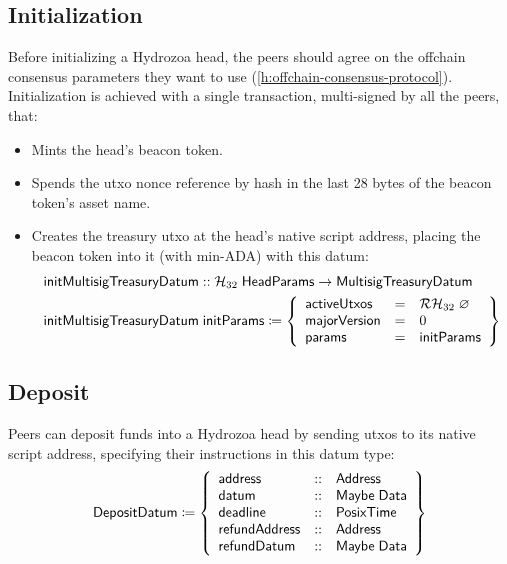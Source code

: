 \documentclass[../hydrozoa.tex]{subfiles}
\begin{document}
\subsection{Initialization}%
\label{h:multisig-init}
Before initializing a Hydrozoa head, the peers should agree on the offchain consensus parameters they want to use (\cref{h:offchain-consensus-protocol}).
Initialization is achieved with a single transaction, multi-signed by all the peers, that:
\begin{itemize}
  \item Mints the head's beacon token.
  \item Spends the utxo nonce reference by hash in the last 28 bytes of the beacon token's asset name.
  \item Creates the treasury utxo at the head's native script address, placing the beacon token into it (with min-ADA) with this datum:
    \begin{equation*}
    \begin{split}
      \mathsf{initMultisigTreasuryDatum} &:: \mathcal{H}_{32} \; \mathsf{HeadParams} -> \mathsf{MultisigTreasuryDatum} \\
      \mathsf{initMultisigTreasuryDatum} &\; \mathsf{initParams} \coloneq \left\{
        \begin{array}{lll}
          \mathsf{activeUtxos} &=& \mathcal{RH}_{32} \; \varnothing \\
          \mathsf{majorVersion} &=& 0 \\
          \mathsf{params} &=& \mathsf{initParams}
        \end{array}\right\}
    \end{split}
    \end{equation*}
\end{itemize}

\subsection{Deposit}%
\label{h:multisig-deposit}
Peers can deposit funds into a Hydrozoa head by sending utxos to its native script address, specifying their instructions in this datum type:
\begin{equation*}
  \mathsf{DepositDatum} \coloneq \left\{
  \begin{array}{lll}
    \mathsf{address} &::& \mathsf{Address} \\
    \mathsf{datum} &::& \mathsf{Maybe \; Data} \\
    \mathsf{deadline} &::& \mathsf{PosixTime} \\
    \mathsf{refundAddress} &::& \mathsf{Address} \\
    \mathsf{refundDatum} &::& \mathsf{Maybe \; Data}
  \end{array}\right\}
\end{equation*}
\end{document}
